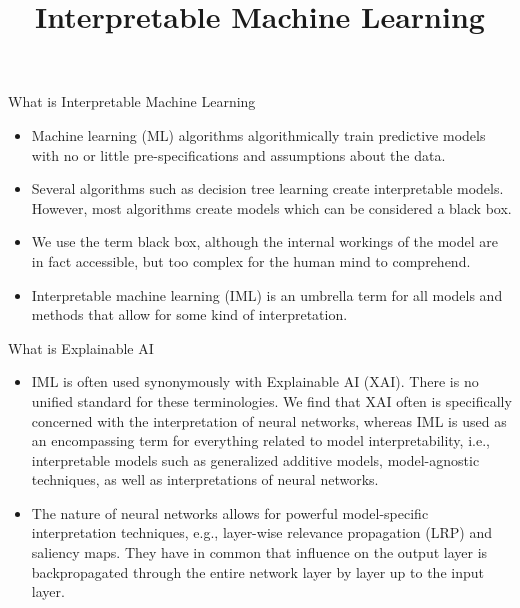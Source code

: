 \documentclass[11pt,compress,t,notes=noshow, xcolor=table]{beamer}
\title{Interpretable Machine Learning}
\institute{\href{https://compstat-lmu.github.io/lecture_iml/}{compstat-lmu.github.io/lecture\_iml}}
\date{}
\begin{document}


\newcommand{\titlefigure}{figure/open_blackbox}
\newcommand{\learninggoals}{
\item What is interpretable machine learning (IML) and Explainable Artificial Intelligence (XAI)?
\item What is interpretability?
\item What is the purpose of IML?
\item What are the fundamental terms and concepts of IML?}


\begin{vbframe}{What is Interpretable Machine Learning}
\begin{itemize}
\itemsep2em
\item Machine learning (ML) algorithms algorithmically train predictive models with no or little pre-specifications and assumptions about the data.
\item Several algorithms such as decision tree learning create interpretable models. However, most algorithms create models which can be considered a black box.
\item We use the term black box, although the internal workings of the model are in fact accessible, but too complex for the human mind to comprehend. 
\item Interpretable machine learning (IML) is an umbrella term for all models and methods that allow for some kind of interpretation.
\end{itemize}
\end{vbframe}

\begin{vbframe}{What is Explainable AI}
\begin{itemize}
\itemsep2em
\item IML is often used synonymously with Explainable AI (XAI). There is no unified standard for these terminologies. We find that XAI often is specifically concerned with the interpretation of neural networks, whereas IML is used as an encompassing term for everything related to model interpretability, i.e., interpretable models such as generalized additive models, model-agnostic techniques, as well as interpretations of neural networks.
\item The nature of neural networks allows for powerful model-specific interpretation techniques, e.g., layer-wise relevance propagation (LRP) and saliency maps. They have in common that influence on the output layer is backpropagated through the entire network layer by layer up to the input layer.
\end{itemize}
\end{vbframe}
\end{document}
